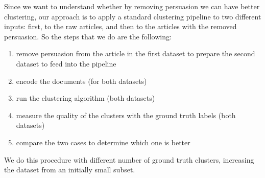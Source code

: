 Since we want to understand whether by removing persuasion we can have better clustering, our approach is to apply a standard clustering pipeline to two different inputs: first, to the raw articles, and then to the articles with the removed persuasion. So the steps that we do are the following:
\begin{enumerate}
    \item remove persuasion from the article in the first dataset to prepare the second dataset to feed into the pipeline
    \item encode the documents (for both datasets)
    \item run the clustering algorithm (both datasets)
    \item measure the quality of the clusters with the ground truth labels (both datasets)
    \item compare the two cases to determine which one is better
\end{enumerate}

We do this procedure with different number of ground truth clusters, increasing the dataset from an initially small subset.%



